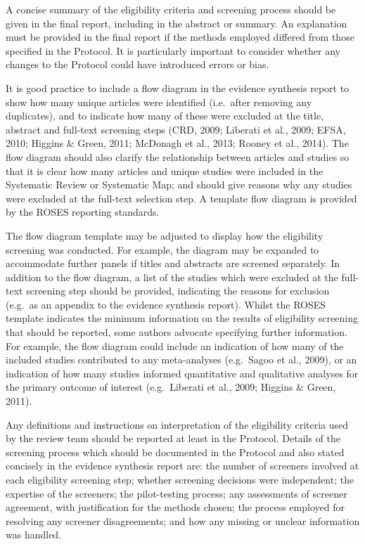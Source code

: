 \documentclass[
  letterpaper,
  DIV=11,
  numbers=noendperiod]{scrreprt}
\begin{document}
A concise summary of the eligibility criteria and screening process
should be given in the final report, including in the abstract or
summary. An explanation must be provided in the final report if the
methods employed differed from those specified in the Protocol. It is
particularly important to consider whether any changes to the Protocol
could have introduced errors or bias.

It is good practice to include a flow diagram in the evidence synthesis
report to show how many unique articles were identified (i.e.~after
removing any duplicates), and to indicate how many of these were
excluded at the title, abstract and full-text screening steps (CRD,
2009; Liberati et al., 2009; EFSA, 2010; Higgins \& Green, 2011;
McDonagh et al., 2013; Rooney et al., 2014). The flow diagram should
also clarify the relationship between articles and studies so that it is
clear how many articles and unique studies were included in the
Systematic Review or Systematic Map; and should give reasons why any
studies were excluded at the full-text selection step. A template flow
diagram is provided by the ROSES reporting standards.

The flow diagram template may be adjusted to display how the eligibility
screening was conducted. For example, the diagram may be expanded to
accommodate further panels if titles and abstracts are screened
separately. In addition to the flow diagram, a list of the studies which
were excluded at the full-text screening step should be provided,
indicating the reasons for exclusion (e.g.~as an appendix to the
evidence synthesis report). Whilst the ROSES template indicates the
minimum information on the results of eligibility screening that should
be reported, some authors advocate specifying further information. For
example, the flow diagram could include an indication of how many of the
included studies contributed to any meta-analyses (e.g.~Sagoo et al.,
2009), or an indication of how many studies informed quantitative and
qualitative analyses for the primary outcome of interest (e.g.~Liberati
et al., 2009; Higgins \& Green, 2011).

Any definitions and instructions on interpretation of the eligibility
criteria used by the review team should be reported at least in the
Protocol. Details of the screening process which should be documented in
the Protocol and also stated concisely in the evidence synthesis report
are: the number of screeners involved at each eligibility screening
step; whether screening decisions were independent; the expertise of the
screeners; the pilot-testing process; any assessments of screener
agreement, with justification for the methods chosen; the process
employed for resolving any screener disagreements; and how any missing
or unclear information was handled.
\end{document}
